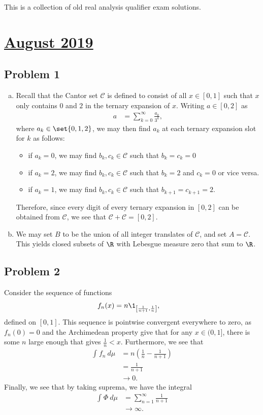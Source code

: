 \documentclass[10pt]{mypackage}
\begin{document}
\RaggedRight
This is a collection of old real analysis qualifier exam solutions.
\section{\href{https://math.virginia.edu/graduate/exams/analysis/2019Aug_real.pdf}{August 2019}}%
\subsection{Problem 1}%
\begin{enumerate}[(a)]
  \item Recall that the Cantor set $\mathcal{C}$ is defined to consist of all $x\in [0,1]$ such that $x$ only contains $0$ and $2$ in the ternary expansion of $x$. Writing $a\in [0,2]$ as
    \begin{align*}
      a &= \sum_{k=0}^{\infty}\frac{a_k}{3^{k}},
    \end{align*}
    where $a_k\in\set{0,1,2}$, we may then find $a_k$ at each ternary expansion slot for $k$ as follows:
    \begin{itemize}
      \item if $a_k = 0$, we may find $b_k,c_k\in \mathcal{C}$ such that $b_k = c_k = 0$
      \item if $a_k = 2$, we may find $b_k,c_k\in \mathcal{C}$ such that $b_k = 2$ and $c_k = 0$ or vice versa.
      \item if $a_k = 1$, we may find $b_k,c_k\in \mathcal{C}$ such that $b_{k+1} = c_{k+1} = 2$.
    \end{itemize}
    Therefore, since every digit of every ternary expansion in $[0,2]$ can be obtained from $\mathcal{C}$, we see that $\mathcal{C} + \mathcal{C} = [0,2]$.
  \item We may set $B$ to be the union of all integer translates of $\mathcal{C}$, and set $A = \mathcal{C}$. This yields closed subsets of $\R$ with Lebesgue measure zero that sum to $\R$.
\end{enumerate}
\subsection{Problem 2}%
Consider the sequence of functions
\begin{align*}
  f_n(x) &= n\1_{\left[ \frac{1}{n+1},\frac{1}{n} \right]},
\end{align*}
defined on $\left[ 0,1 \right]$. This sequence is pointwise convergent everywhere to zero, as $f_n(0) = 0$ and the Archimedean property give that for any $x\in (0,1]$, there is some $n$ large enough that gives $\frac{1}{n} < x$. Furthermore, we see that
\begin{align*}
  \int_{}^{} f_n\:d\mu &= n\left( \frac{1}{n}- \frac{1}{n+1} \right)\\
                       &= \frac{1}{n+1}\\
                       &\rightarrow 0.
\end{align*}
Finally, we see that by taking suprema, we have the integral
\begin{align*}
  \int_{}^{} \Phi\:d\mu &= \sum_{n=1}^{\infty}\frac{1}{n+1}\\
                        &\rightarrow \infty.
\end{align*}
\end{document}
